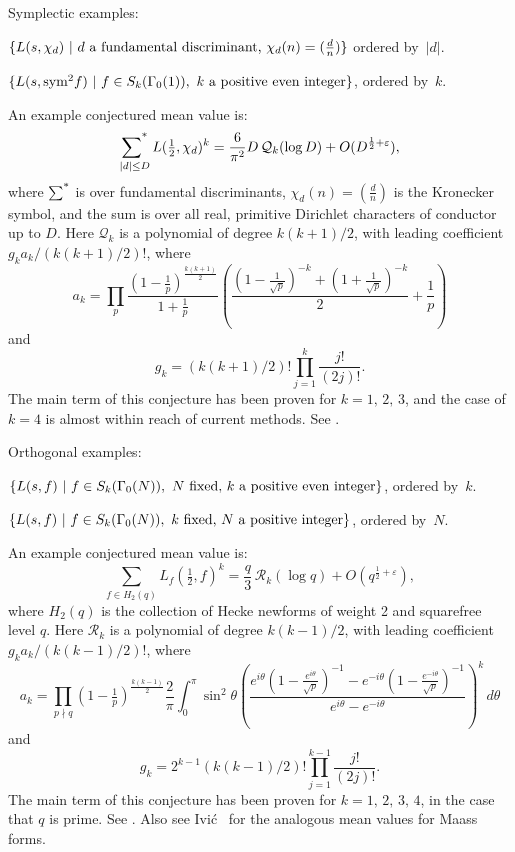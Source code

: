 \documentclass[12pt,letterpaper]{amsart}
\theoremstyle{plain}
\theoremstyle{definition}
\theoremstyle{remark}
\numberwithin{equation}{subsection}
\numberwithin{theorem}{subsection}
\numberwithin{table}{subsection}
\def\sumstar{\operatornamewithlimits{\sum\nolimits^*}}
\def\myitem#1{\noindent{\it #1 }}
\begin{document}
Symplectic examples:

\myitem{3)} $\{L(s,\chi_d)\ |\ d \hbox{ a fundamental discriminant, }
 \chi_d(n)=(\tfrac{d}{n})\}$ ordered by~$|d|$.

\myitem{4)} $\{L(s, \hbox{sym}^2 f)\ |\ f\in S_k(\Gamma_0(1)),
                \hbox{ $k$ a positive even integer}\}$, ordered by~$k$.

An example  conjectured mean value is:
\begin{equation}
\sumstar_{|d|\le D}L(\tfrac12 ,\chi_d)^k= \frac{6}{\pi^2}D\, {\mathcal
Q}_{k}(\log D) +O(D^{\frac12 +\varepsilon}), \label{eqn:sumchidk}
\end{equation}
where $\sumstar$ is over fundamental discriminants,
$\chi_d(n)=(\tfrac{d}{n})$ is the Kronecker symbol,
and the sum is over all real,
primitive Dirichlet characters of conductor up to $D$.
Here ${\mathcal Q}_k$  is a polynomial of degree $k(k+1)/2$,
with leading coefficient $g_k a_k/(k(k+1)/2)!$, where
\begin{equation}
a_k=\prod_p \frac{(1-\frac 1p)^{\frac{k(k+1)}{2}}}
{1+\frac 1p}
\left(\frac{(1-\frac{1}{\sqrt{p}})^{-k}+
(1+\frac{1}{\sqrt{p}})^{-k}}{2}+\frac{1}{p}\right)
\end{equation}
and
\begin{equation}
g_k=  (k(k+1)/2)! \prod_{j=1}^k\frac{j!}{(2j)!} .
\end{equation}
The main term of this conjecture has been proven for
$k=1,\,2,\,3$, and the case of $k=4$ is almost within reach of
current methods. See \cite{GV,J,So}.

Orthogonal examples:

\myitem{5)} $\{L(s,f)\ |\ f\in S_k(\Gamma_0(N)),
        \hbox{ $N$ fixed, $k$ a positive even integer}\}$,
ordered by~$k$.

\myitem{6)} $\{L(s,f)\ |\ f\in S_k(\Gamma_0(N)),
                \hbox{ $k$ fixed, $N$ a positive integer}\}$, ordered by~$N$.

An example  conjectured mean value is:
\begin{equation} 
\sum_{f\in H_2(q)}L_f(\tfrac12,f )^k =\frac{q}{3} \, {\mathcal R}_k(\log q)
+O(q^{\frac12 +\varepsilon}) , \label{eqn:sumlfk}
\end{equation}
where $H_2(q)$ is the collection of Hecke newforms
of weight 2 and squarefree level $q$.
Here ${\mathcal R}_k$ is a polynomial of degree $k(k-1)/2$, with leading
coefficient $g_k a_k/(k(k-1)/2)!$, where
\begin{equation} a_k=\prod_{p\nmid q}
\left(1-\tfrac{1}{p}\right)^{\frac{k(k-1)}{2}}
\frac{2}{\pi}\int_0^\pi  \sin^2\theta
\left(\frac{e^{i\theta}\left(1-\frac{e^{i\theta}}{\sqrt{p}}\right)^{-1}
-e^{-i\theta}\left(1-\frac{e^{-i\theta}}{\sqrt{p}}\right)^{-1}}
{e^{i\theta}-e^{-i\theta}}\right)^k \,d\theta
\end{equation}
and
\begin{equation}g_k = 2^{k-1}(k(k-1)/2)!\prod_{j=1}^{k-1}\frac{j!}{(2j)!} .
\end{equation}
The main term of this conjecture has been proven for
$k=1,\,2,\,3,\,4$, in the case that $q$ is prime. See
\cite{D,DFI,KMV}.  Also see Ivi\'c~\cite{Iv2} for the analogous mean values
for Maass forms.
\end{document}
